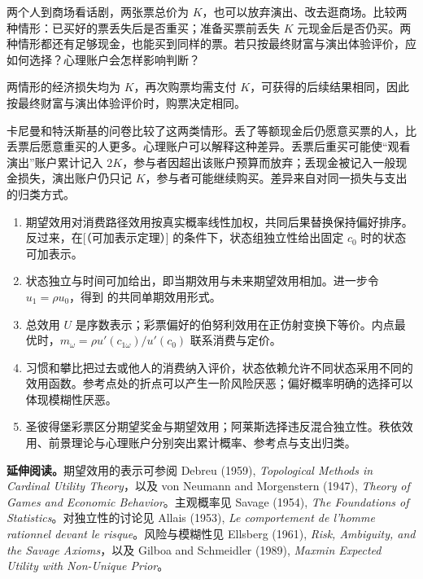 \begin{tcolorbox}[example,title=课堂例题：演出票与现金的损失]
\begin{question}
两个人到商场看话剧，两张票总价为 $K$，也可以放弃演出、改去逛商场。比较两种情形：已买好的票丢失后是否重买；准备买票前丢失 $K$ 元现金后是否仍买。两种情形都还有足够现金，也能买到同样的票。若只按最终财富与演出体验评价，应如何选择？心理账户会怎样影响判断？
\end{question}

\begin{solution}[blank-type=manual,blank-vsep=3\baselineskip]
两情形的经济损失均为 $K$，再次购票均需支付 $K$，可获得的后续结果相同，因此按最终财富与演出体验评价时，购票决定相同。

卡尼曼和特沃斯基的问卷比较了这两类情形。丢了等额现金后仍愿意买票的人，比丢票后愿意重买的人更多。心理账户可以解释这种差异。丢票后重买可能使“观看演出”账户累计记入 $2K$，参与者因超出该账户预算而放弃；丢现金被记入一般现金损失，演出账户仍只记 $K$，参与者可能继续购买。差异来自对同一损失与支出的归类方式。
\end{solution}
\end{tcolorbox}

\WJChapterSummary
\begin{tcolorbox}[summary]
\begin{enumerate}
 \item 期望效用对消费路径效用按真实概率线性加权，共同后果替换保持偏好排序。反过来，在[（可加表示定理）] 的条件下，状态组独立性给出固定 $c_0$ 时的状态可加表示。
 \item 状态独立与时间可加给出，即当期效用与未来期望效用相加。进一步令 $u_1=\rho u_0$，得到 的共同单期效用形式。
 \item 总效用 $U$ 是序数表示；彩票偏好的伯努利效用在正仿射变换下等价。内点最优时，$m_\omega=\rho u'(c_{1\omega})/u'(c_0)$ 联系消费与定价。
 \item 习惯和攀比把过去或他人的消费纳入评价，状态依赖允许不同状态采用不同的效用函数。参考点处的折点可以产生一阶风险厌恶；偏好概率明确的选择可以体现模糊性厌恶。
 \item 圣彼得堡彩票区分期望奖金与期望效用；阿莱斯选择违反混合独立性。秩依效用、前景理论与心理账户分别突出累计概率、参考点与支出归类。
\end{enumerate}
\end{tcolorbox}

\textbf{延伸阅读。}期望效用的表示可参阅 Debreu (1959), \emph{Topological Methods in Cardinal Utility Theory}，以及 von Neumann and Morgenstern (1947), \emph{Theory of Games and Economic Behavior}。主观概率见 Savage (1954), \emph{The Foundations of Statistics}。对独立性的讨论见 Allais (1953), \emph{Le comportement de l'homme rationnel devant le risque}。风险与模糊性见 Ellsberg (1961), \emph{Risk, Ambiguity, and the Savage Axioms}，以及 Gilboa and Schmeidler (1989), \emph{Maxmin Expected Utility with Non-Unique Prior}。

